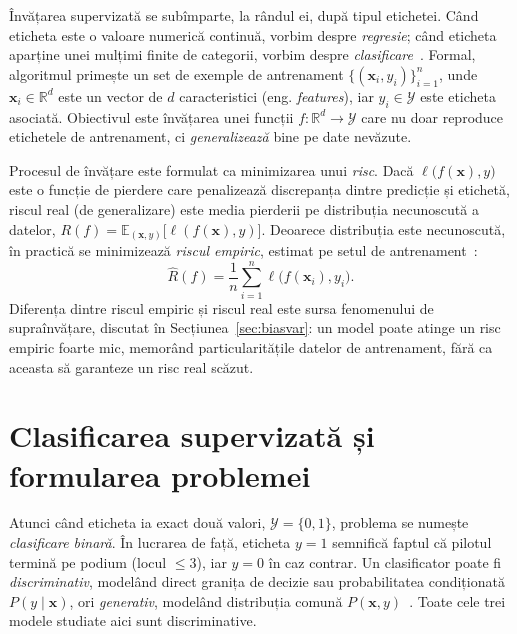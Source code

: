 \documentclass[12pt,a4paper]{report}
\begin{document}
Învățarea supervizată se subîmparte, la rândul ei, după tipul etichetei. Când eticheta este o
valoare numerică continuă, vorbim despre \emph{regresie}; când eticheta aparține unei mulțimi
finite de categorii, vorbim despre \emph{clasificare}~\cite{james2013introduction}. Formal,
algoritmul primește un set de exemple de antrenament $\{(\mathbf{x}_i, y_i)\}_{i=1}^{n}$, unde
$\mathbf{x}_i \in \mathbb{R}^d$ este un vector de $d$ caracteristici (eng. \emph{features}), iar
$y_i \in \mathcal{Y}$ este eticheta asociată. Obiectivul este învățarea unei funcții
$f: \mathbb{R}^d \to \mathcal{Y}$ care nu doar reproduce etichetele de antrenament, ci
\emph{generalizează} bine pe date nevăzute.

Procesul de învățare este formulat ca minimizarea unui \emph{risc}. Dacă
$\ell\big(f(\mathbf{x}), y\big)$ este o funcție de pierdere care penalizează discrepanța dintre
predicție și etichetă, riscul real (de generalizare) este media pierderii pe distribuția
necunoscută a datelor, $R(f) = \mathbb{E}_{(\mathbf{x}, y)}\big[\ell(f(\mathbf{x}), y)\big]$.
Deoarece distribuția este necunoscută, în practică se minimizează \emph{riscul empiric},
estimat pe setul de antrenament~\cite{hastie2009elements}:
\begin{equation}
  \hat{R}(f) = \frac{1}{n} \sum_{i=1}^{n} \ell\big(f(\mathbf{x}_i), y_i\big).
  \label{eq:risc}
\end{equation}
Diferența dintre riscul empiric și riscul real este sursa fenomenului de supraînvățare, discutat
în Secțiunea~\ref{sec:biasvar}: un model poate atinge un risc empiric foarte mic, memorând
particularitățile datelor de antrenament, fără ca aceasta să garanteze un risc real scăzut.

\section{Clasificarea supervizată și formularea problemei}
\label{sec:clasificare}

Atunci când eticheta ia exact două valori, $\mathcal{Y} = \{0, 1\}$, problema se numește
\emph{clasificare binară}. În lucrarea de față, eticheta $y = 1$ semnifică faptul că pilotul
termină pe podium (locul $\leq 3$), iar $y = 0$ în caz contrar. Un clasificator poate fi
\emph{discriminativ}, modelând direct granița de decizie sau probabilitatea condiționată
$P(y \mid \mathbf{x})$, ori \emph{generativ}, modelând distribuția comună
$P(\mathbf{x}, y)$~\cite{bishop2006pattern}. Toate cele trei modele studiate aici sunt
discriminative.
\end{document}
